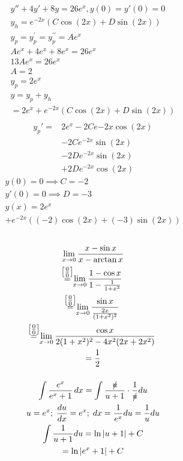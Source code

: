\documentclass[defaultpackages]{cheatsheet}
\newcommand\nillnill{\stackrel{\mathclap{\normalfont\mbox{$\left[\frac{0}{0}\right]$}}}{=}}
\begin{document}
	\subsubsection{}
	\begin{gather*}
		y''+4y'+8y=26e^x, y(0)=y'(0)=0\\
		y_h = e^{-2x}(C\cos(2x)+D\sin(2x))\\
		y_p = y_p^\prime = y_p^{\prime\prime} = Ae^x\\
		Ae^x + 4e^x+8e^x = 26e^x\\
		13Ae^x = 26e^x\\
		A=2\\
		y_p = 2e^x\\
		y = y_p + y_h\\
		= 2e^x + e^{-2x}(C\cos(2x)+D\sin(2x))\\
	\end{gather*}
	\begin{align*}
		y_p' =& 2e^x-2Ce{-2x}\cos(2x)\\
		&-2Ce^{-2x}\sin(2x)\\
		&-2De^{-2x}\sin(2x)\\
		&+2De^{-2x}\cos(2x)
	\end{align*}
	\begin{gather*}
		y(0)=0 \implies C = -2\\
		y'(0) = 0\implies D=-3\\
		y(x)=2e^x\\+e^{-2x}((-2)\cos(2x)+(-3)\sin(2x))
	\end{gather*}
	\subsection{}
	\subsubsection{}
	\begin{gather*}
		\lim_{x\to 0}\frac{x-\sin x}{x-\arctan x}\\
		\nillnill \lim_{x\to0} \frac{1-\cos x}{1-\frac{1}{1+x^2}}\\
		\nillnill \lim_{x\to0} \frac{\sin x}{\frac{2x}{(1+x^2)^2}}\\
		\nillnill \lim_{x\to0} \frac{\cos x}{2(1+x^2)^2 - 4x^2(2x+2x^2)}\\
		= \frac{1}{2}
	\end{gather*}
	\subsubsection{}
	\begin{gather*}
		\int \frac{e^x}{e^x+1}\,dx = \int \frac{\slashed{u}}{u+1}\cdot \frac{1}{\slashed{u}} du\\
		u = e^x;\;\frac{du}{dx} = e^x;\; dx = \frac{1}{e^x} du = \frac{1}{u}du\\
		\int \frac{1}{u+1} du = \ln |u+1|+C \\= \ln |e^x+1|+C
	\end{gather*}
\end{document}
